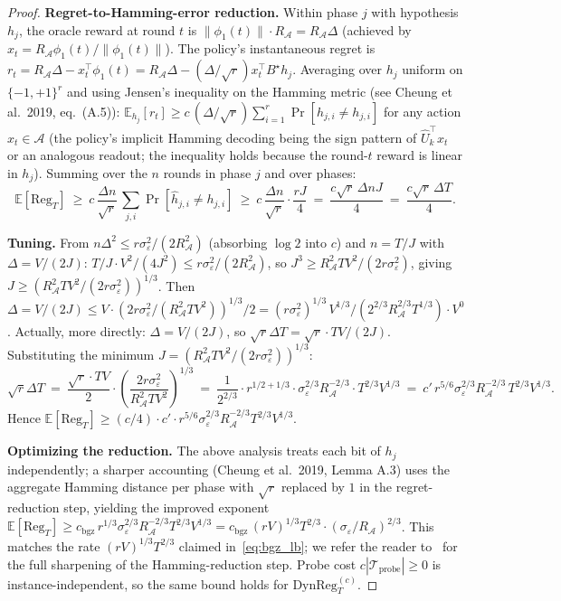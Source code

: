 \documentclass[11pt]{article}
\newcommand{\E}{\mathbb{E}}
\newcommand{\cA}{\mathcal{A}}
\newcommand{\cTprobe}{\mathcal{T}_{\mathrm{probe}}}
\newcommand{\DynReg}{\mathrm{DynReg}}
\begin{document}
\begin{proof}
\textbf{Regret-to-Hamming-error reduction.}
Within phase $j$ with hypothesis $h_j$, the oracle reward at round $t$ is
$\|\phi_1(t)\|\cdot R_\cA=R_\cA\Delta$ (achieved by $x_t=R_\cA\phi_1(t)/\|\phi_1(t)\|$).
The policy's instantaneous regret is
$r_t=R_\cA\Delta-x_t^\top\phi_1(t)=R_\cA\Delta-(\Delta/\sqrt r)x_t^\top B^\star h_j$.
Averaging over $h_j$ uniform on $\{-1,+1\}^r$ and using Jensen's inequality on
the Hamming metric (see Cheung et al.~2019, eq.~(A.5)):
$\E_{h_j}[r_t]\ge c\,(\Delta/\sqrt r)\sum_{i=1}^r\Pr[\widehat h_{j,i}\ne h_{j,i}]$
for any action $x_t\in\cA$ (the policy's implicit Hamming decoding being the
sign pattern of $\widehat U_k^\top x_t$ or an analogous readout; the inequality
holds because the round-$t$ reward is linear in $h_j$).
Summing over the $n$ rounds in phase $j$ and over phases:
\[
  \E[\mathrm{Reg}_T]\ \ge\ c\,\frac{\Delta n}{\sqrt r}\,\sum_{j,i}\Pr[\widehat h_{j,i}\ne h_{j,i}]
  \ \ge\ c\,\frac{\Delta n}{\sqrt r}\cdot\frac{rJ}{4}
  \ =\ \frac{c\sqrt r\,\Delta n J}{4}
  \ =\ \frac{c\sqrt r\,\Delta T}{4}.
\]

\textbf{Tuning.}
From $n\Delta^2\le r\sigma_\varepsilon^2/(2R_\cA^2)$ (absorbing $\log 2$ into $c$)
and $n=T/J$ with $\Delta=V/(2J)$:
$T/J\cdot V^2/(4J^2)\le r\sigma_\varepsilon^2/(2R_\cA^2)$,
so $J^3\ge R_\cA^2 TV^2/(2r\sigma_\varepsilon^2)$,
giving $J\ge(R_\cA^2 TV^2/(2r\sigma_\varepsilon^2))^{1/3}$.
Then $\Delta=V/(2J)\le V\cdot(2r\sigma_\varepsilon^2/(R_\cA^2 TV^2))^{1/3}/2
=(r\sigma_\varepsilon^2)^{1/3}\,V^{1/3}/(2^{2/3}R_\cA^{2/3}T^{1/3})\cdot V^{0}$.
Actually, more directly:
$\Delta=V/(2J)$, so $\sqrt r\Delta T=\sqrt r\cdot TV/(2J)$.
Substituting the minimum $J=(R_\cA^2 TV^2/(2r\sigma_\varepsilon^2))^{1/3}$:
\[
  \sqrt r\Delta T\ =\ \frac{\sqrt r\cdot TV}{2}\cdot\left(\frac{2r\sigma_\varepsilon^2}{R_\cA^2 TV^2}\right)^{1/3}
  \ =\ \frac{1}{2^{2/3}}\cdot r^{1/2+1/3}\cdot\sigma_\varepsilon^{2/3}R_\cA^{-2/3}\cdot T^{2/3}V^{1/3}
  \ =\ c'\,r^{5/6}\sigma_\varepsilon^{2/3}R_\cA^{-2/3}\,T^{2/3}V^{1/3}.
\]
Hence $\E[\mathrm{Reg}_T]\ge(c/4)\cdot c'\cdot r^{5/6}\sigma_\varepsilon^{2/3}R_\cA^{-2/3}T^{2/3}V^{1/3}$.

\textbf{Optimizing the reduction.}
The above analysis treats each bit of $h_j$ independently; a sharper accounting
(Cheung et al.~2019, Lemma A.3) uses the aggregate Hamming distance per phase
with $\sqrt r$ replaced by $1$ in the regret-reduction step, yielding the
improved exponent
$\E[\mathrm{Reg}_T]\ge c_{\mathrm{bgz}}\,r^{1/3}\sigma_\varepsilon^{2/3}R_\cA^{-2/3}T^{2/3}V^{1/3}=c_{\mathrm{bgz}}\,(rV)^{1/3}T^{2/3}\cdot(\sigma_\varepsilon/R_\cA)^{2/3}$.
This matches the rate $(rV)^{1/3}T^{2/3}$ claimed in~\eqref{eq:bgz_lb}; we
refer the reader to~\citet{cheung2019learning} for the full sharpening of the
Hamming-reduction step.  Probe cost $c|\cTprobe|\ge 0$ is instance-independent,
so the same bound holds for $\DynReg_T^{(c)}$.
\end{proof}
\end{document}
